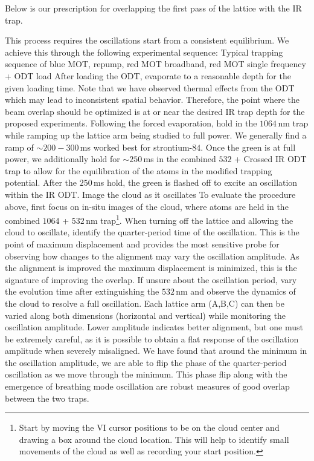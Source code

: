 Below is our prescription for overlapping the first pass of the lattice with the IR trap.
\begin{outline}[enumerate]
\1 This process requires the oscillations start from a consistent equilibrium.
We achieve this through the following experimental sequence:
	\2 Typical trapping sequence of blue MOT, repump, red MOT broadband, red MOT single frequency + ODT load
	\2 After loading the ODT, evaporate to a reasonable depth for the given loading time.
	Note that we have observed thermal effects from the ODT which may lead to inconsistent spatial behavior.
	Therefore, the point where the beam overlap should be optimized is at or near the desired IR trap depth for the proposed experiments.
	\2 Following the forced evaporation, hold in the $1064$\,nm trap while ramping up the lattice arm being studied to full power.
	We generally find a ramp of $\sim200 - 300$\,ms worked best for strontium-$84$. 
	\2 Once the green is at full power, we additionally hold for $\sim250$\,ms in the combined $532$ + Crossed IR ODT trap to allow for the equilibration of the atoms in the modified trapping potential.
	\2 After the $250$\,ms hold, the green is flashed off to excite an oscillation within the IR ODT.
	\2 Image the cloud as it oscillates
\1 To evaluate the procedure above, first focus on in-situ images of the cloud, where atoms are held in the combined $1064$ + $532$\,nm trap\footnote{
Start by moving the VI cursor positions to be on the cloud center and drawing a box around the cloud location.
This will help to identify small movements of the cloud as well as recording your start position.}.  
\1 When turning off the lattice and allowing the cloud to oscillate, identify the quarter-period time of the oscillation. 
This is the point of maximum displacement and provides the most sensitive probe for observing how changes to the alignment may vary the oscillation amplitude.
As the alignment is improved the maximum displacement is minimized, this is the signature of improving the overlap.
If unsure about the oscillation period, vary the evolution time after extinguishing the $532$\,nm and observe the dynamics of the cloud to resolve a full oscillation.
\1 Each lattice arm (A,B,C) can then be varied along both dimensions (horizontal and vertical) while monitoring the oscillation amplitude. 
Lower amplitude indicates better alignment, but one must be extremely careful, as it is possible to obtain a flat response of the oscillation amplitude when severely misaligned.
We have found that around the minimum in the oscillation amplitude, we are able to flip the phase of the quarter-period oscillation as we move through the minimum.
This phase flip along with the emergence of breathing mode oscillation are robust measures of good overlap between the two traps.
\end{outline}

